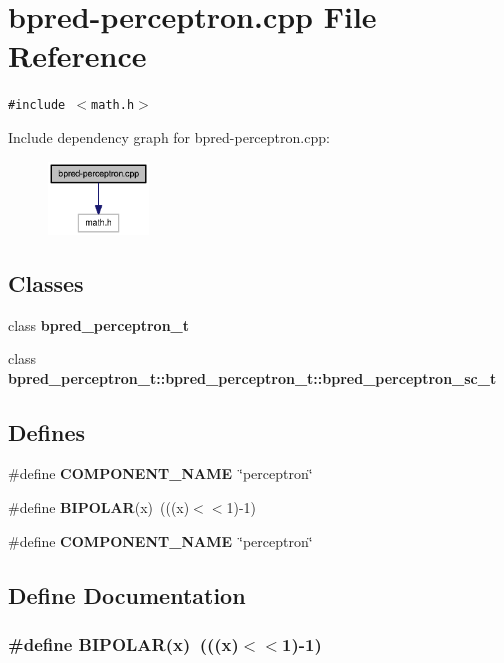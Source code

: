 \section{bpred-perceptron.cpp File Reference}
\label{bpred-perceptron_8cpp}
{\tt \#include $<$math.h$>$}\par


Include dependency graph for bpred-perceptron.cpp:\nopagebreak
\begin{figure}[H]
\begin{center}
\leavevmode
\includegraphics[width=76pt]{bpred-perceptron_8cpp__incl}
\end{center}
\end{figure}
\subsection*{Classes}
\begin{CompactItemize}
\item 
class {\bf bpred\_\-perceptron\_\-t}
\item 
class {\bf bpred\_\-perceptron\_\-t::bpred\_\-perceptron\_\-t::bpred\_\-perceptron\_\-sc\_\-t}
\end{CompactItemize}
\subsection*{Defines}
\begin{CompactItemize}
\item 
\#define {\bf COMPONENT\_\-NAME}~\char`\"{}perceptron\char`\"{}
\item 
\#define {\bf BIPOLAR}(x)~(((x)$<$$<$1)-1)
\item 
\#define {\bf COMPONENT\_\-NAME}~\char`\"{}perceptron\char`\"{}
\end{CompactItemize}


\subsection{Define Documentation}
\subsubsection[{BIPOLAR}]{\setlength{\rightskip}{0pt plus 5cm}\#define BIPOLAR(x)~(((x)$<$$<$1)-1)}\label{bpred-perceptron_8cpp_d1289ccac63a964f638d03575fed7697}




